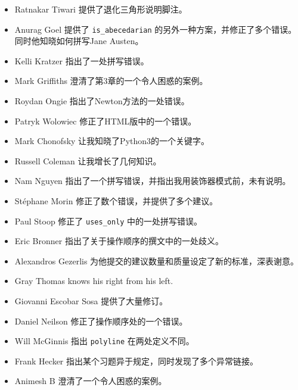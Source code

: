 \documentclass[10pt]{book}
\begin{document}
\begin{itemize}
\item Ratnakar Tiwari 提供了退化三角形说明脚注。

\item Anurag Goel 提供了 \verb"is_abecedarian"
的另外一种方案，并修正了多个错误。同时他知晓如何拼写Jane Austen。

\item Kelli Kratzer 指出了一处拼写错误。

\item Mark Griffiths 澄清了第3章的一个令人困惑的案例。

\item Roydan Ongie 指出了Newton方法的一处错误。

\item Patryk Wolowiec  修正了HTML版中的一个错误。

\item Mark Chonofsky 让我知晓了Python3的一个关键字。

\item Russell Coleman 让我增长了几何知识。

\item Nam Nguyen 指出了一个拼写错误，并指出我用装饰器模式前，未有说明。

\item St\'{e}phane Morin 修正了数个错误，并提供了多个建议。

\item Paul Stoop  修正了  \verb+uses_only+ 中的一处拼写错误。

\item Eric Bronner  指出了关于操作顺序的撰文中的一处歧义。

\item Alexandros Gezerlis 为他提交的建议数量和质量设定了新的标准，深表谢意。

\item Gray Thomas knows his right from his left.

\item Giovanni Escobar Sosa 提供了大量修订。

\item Daniel Neilson 修正了操作顺序处的一个错误。

\item Will McGinnis 指出 {\tt polyline} 在两处定义不同。 

\item Frank Hecker 指出某个习题异于规定，同时发现了多个异常链接。

\item Animesh B 澄清了一个令人困惑的案例。


\end{itemize}
\end{document}
